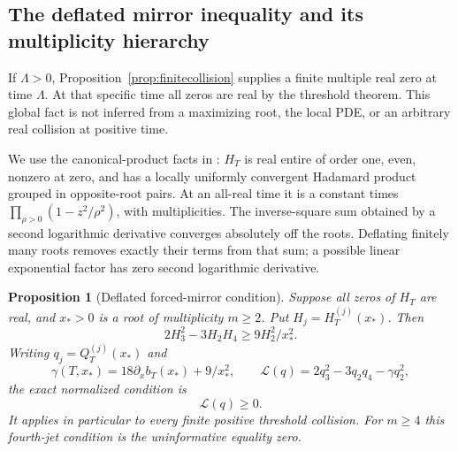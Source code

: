 \documentclass[11pt]{article}
\numberwithin{equation}{section}
\newtheorem{proposition}[theorem]{Proposition}
\theoremstyle{definition}
\theoremstyle{remark}
\begin{document}
\subsection{The deflated mirror inequality and its multiplicity hierarchy}

If \(\Lambda>0\), Proposition~\ref{prop:finitecollision} supplies a
finite multiple real zero at time \(\Lambda\). At that specific time
all zeros are real by the threshold theorem. This global fact is not
inferred from a maximizing root, the local PDE, or an arbitrary real
collision at positive time.

We use the canonical-product facts in
\cite[Section 3 and the proof of Proposition 3.1]{polymath}:
\(H_T\) is real entire of order one, even, nonzero at zero, and has
a locally uniformly convergent Hadamard product grouped in opposite-root
pairs. At an all-real time it is a constant times
\(\prod_{\rho>0}(1-z^2/\rho^2)\), with multiplicities.
The inverse-square sum obtained by a second logarithmic derivative
converges absolutely off the roots. Deflating finitely many roots
removes exactly their terms from that sum; a possible linear exponential
factor has zero second logarithmic derivative.

\begin{proposition}[Deflated forced-mirror condition]\label{lj:mirror}
Suppose all zeros of \(H_T\) are real, and \(x_*>0\) is a root of
multiplicity \(m\ge2\). Put \(H_j=H_T^{(j)}(x_*)\). Then
\begin{equation}\label{lj:unnormalizedmirror}
 2H_3^2-3H_2H_4\ge9H_2^2/x_*^2.
\end{equation}
Writing \(q_j=Q_T^{(j)}(x_*)\) and
\begin{equation}\label{lj:gamma}
 \gamma(T,x_*)=18\partial_xb_T(x_*)+9/x_*^2,\qquad
 \mathscr L(q)=2q_3^2-3q_2q_4-\gamma q_2^2,
\end{equation}
the exact normalized condition is
\begin{equation}\label{lj:normalizedmirror}
 \mathscr L(q)\ge0.
\end{equation}
It applies in particular to every finite positive threshold collision.
For \(m\ge4\) this fourth-jet condition is the uninformative equality
zero.
\end{proposition}
\end{document}
